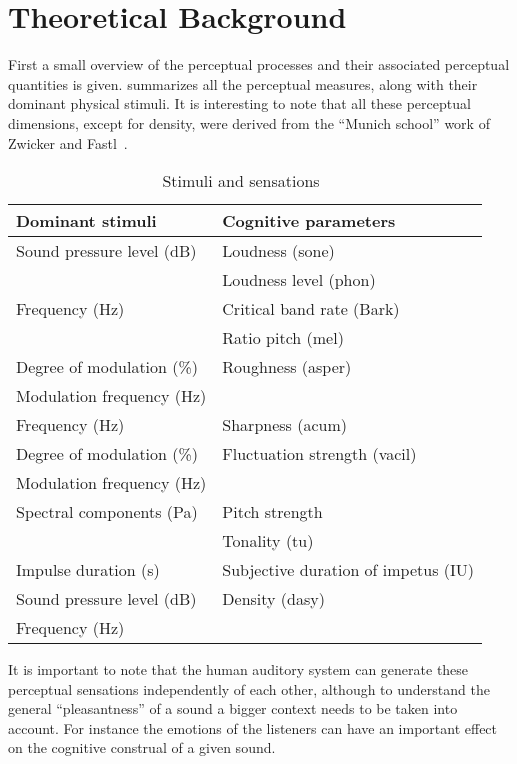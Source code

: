 \documentclass[../main.tex]{subfiles}
\begin{document}
\chapter{Theoretical Background}

First a small overview of the perceptual processes and their associated
perceptual quantities is given.  summarizes all the
perceptual measures, along with their dominant physical stimuli. It is
interesting to note that all these perceptual dimensions, except for density,
were derived from the ``Munich school'' work of Zwicker and
Fastl~\cite{Fastl2007Psychoacoustics}.

\begin{table}[ht]
  \centering
  \begin{tabular}{ l l }
    \toprule
    Dominant stimuli & Cognitive parameters \\
    \midrule
    Sound pressure level (dB) & Loudness (sone) \\
    \cmidrule{2-2}
    & Loudness level (phon) \\
    \midrule
    Frequency (Hz) & Critical band rate (Bark) \\
    \cmidrule{2-2}
    & Ratio pitch (mel) \\
    \midrule
    Degree of modulation (\%) & Roughness (asper)\\
    \cmidrule{1-1}
    Modulation frequency (Hz) & \\
    \midrule
    Frequency (Hz) & Sharpness (acum) \\
    \midrule
    Degree of modulation (\%) & Fluctuation strength (vacil) \\
    \cmidrule{1-1}
    Modulation frequency (Hz) & \\
    \midrule
    Spectral components (Pa) & Pitch strength \\
    \cmidrule{2-2}
    & Tonality (tu) \\
    \midrule
    Impulse duration (s) & Subjective duration of impetus (IU) \\
    \midrule
    Sound pressure level (dB) & Density (dasy) \\
    Frequency (Hz) & \\
    \bottomrule
  \end{tabular}
  \caption{Stimuli and sensations~\cite[pp.~70]{Mueller2012Handbook}}
  \label{tab:stimsens}
\end{table}

It is important to note that the human auditory system can generate these
perceptual sensations independently of each other, although to understand the
general ``pleasantness'' of a sound a bigger context needs to be taken into
account. For instance the emotions of the listeners can have an important
effect on the cognitive construal of a given sound.
\end{document}
